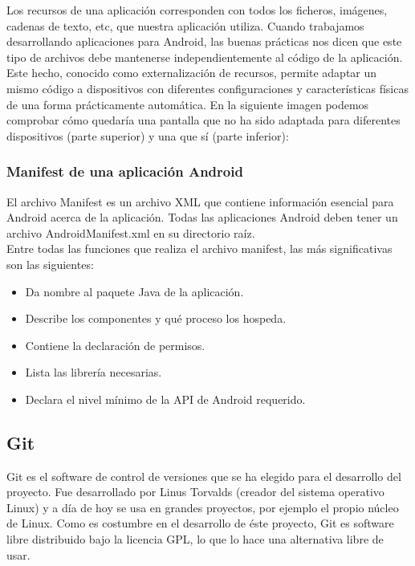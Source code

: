 Los recursos de una aplicación corresponden con todos los ficheros, imágenes, cadenas de texto, etc, que nuestra aplicación utiliza. Cuando trabajamos desarrollando aplicaciones para Android, las buenas prácticas nos dicen que este tipo de archivos debe mantenerse independientemente al código de la aplicación.\\

Este hecho, conocido como externalización de recursos, permite adaptar un mismo código a dispositivos con diferentes configuraciones y características físicas de una forma prácticamente automática. En la siguiente imagen podemos comprobar cómo quedaría una pantalla que no ha sido adaptada para diferentes dispositivos (parte superior) y una que sí (parte inferior):


\subsubsection{Manifest de una aplicación Android}

El archivo Manifest es un archivo XML que contiene información esencial para Android acerca de la aplicación. Todas las aplicaciones Android deben tener un archivo AndroidManifest.xml en su directorio raíz.\\

Entre todas las funciones que realiza el archivo manifest, las más significativas son las siguientes:

\begin{itemize}
\item Da nombre al paquete Java de la aplicación.
\item Describe los componentes y qué proceso los hospeda.
\item Contiene la declaración de permisos.
\item Lista las librería necesarias.
\item Declara el nivel mínimo de la API de Android requerido.
\end{itemize}

\subsection{Git}

Git \cite{website:git} es el software de control de versiones que se ha elegido para el desarrollo del proyecto. Fue desarrollado por Linus Torvalds (creador del sistema operativo Linux) y a día de hoy se usa en grandes proyectos, por ejemplo el propio núcleo de Linux. Como es costumbre en el desarrollo de éste proyecto, Git es software libre distribuido bajo la licencia GPL, lo que lo hace una alternativa libre de usar.\\

